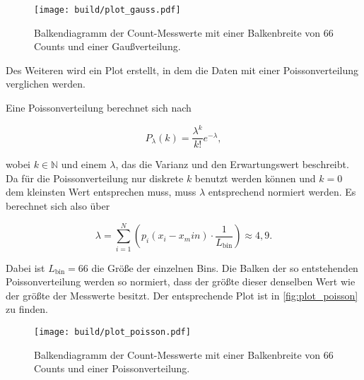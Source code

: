 \begin{figure}
    \centering
    \texttt{[image: build/plot\_gauss.pdf]}
    \caption{Balkendiagramm der Count-Messwerte mit einer Balkenbreite von 66 Counts und einer Gaußverteilung.}
    \label{fig:plot_gauss}
\end{figure}

Des Weiteren wird ein Plot erstellt, in dem die Daten mit einer Poissonverteilung verglichen werden.

Eine Poissonverteilung berechnet sich nach

\begin{equation}
    P_\lambda (k) = \frac{\lambda^k}{k!} e^{-\lambda},
\end{equation}

wobei $k \in \mathds{N}$ und einem $\lambda$, das die Varianz und den Erwartungswert beschreibt. 
Da für die Poissonverteilung nur diskrete $k$ benutzt werden können und $k=0$ dem kleinsten Wert entsprechen muss,
muss $\lambda$ entsprechend normiert werden.
Es berechnet sich also über

\begin{equation}
    \lambda = \sum_{i=1}^{N} (p_i (x_i - x_min) \cdot \frac{1}{L_\text{bin}}) \approx 4,9.
\end{equation}

Dabei ist $L_\text{bin} = 66$ die Größe der einzelnen Bins.
Die Balken der so entstehenden Poissonverteilung werden so normiert, dass der größte dieser denselben Wert wie der größte der Messwerte besitzt.
Der entsprechende Plot ist in \autoref{fig:plot_poisson} zu finden.

\begin{figure}
    \centering
    \texttt{[image: build/plot\_poisson.pdf]}
    \caption{Balkendiagramm der Count-Messwerte mit einer Balkenbreite von 66 Counts und einer Poissonverteilung.}
    \label{fig:plot_poisson}
\end{figure}